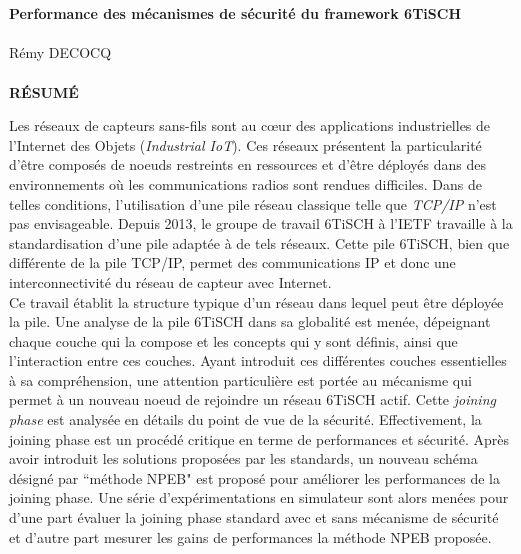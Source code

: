 \documentclass[]{report}
\begin{document}
\newpage
~
\newpage

\vspace{5cm}
~\\

\begin{center}
\textbf{\Large Performance des mécanismes de sécurité du framework 6TiSCH}\\
~\\
{\Large Rémy DECOCQ}\\
~\\
\textbf{\Large RÉSUMÉ}
\end{center}
\vspace{2cm}

\large
Les réseaux de capteurs sans-fils sont au cœur des applications industrielles de l'Internet des Objets (\textit{Industrial IoT}). Ces réseaux présentent la particularité d'être composés de noeuds restreints en ressources et d'être déployés dans des environnements où les communications radios sont rendues difficiles. Dans de telles conditions, l'utilisation d'une pile réseau classique telle que \textit{TCP/IP} n'est pas envisageable. Depuis 2013, le groupe de travail 6TiSCH à l'IETF travaille à la standardisation d'une pile adaptée à de tels réseaux. Cette pile 6TiSCH, bien que différente de la pile TCP/IP, permet des communications IP et donc une interconnectivité du réseau de capteur avec Internet.\\

Ce travail établit la structure typique d'un réseau dans lequel peut être déployée la pile. Une analyse de la pile 6TiSCH dans sa globalité est menée, dépeignant chaque couche qui la compose et les concepts qui y sont définis, ainsi que l'interaction entre ces couches. Ayant introduit ces différentes couches essentielles à sa compréhension, une attention particulière est portée au mécanisme qui permet à un nouveau noeud de rejoindre un réseau 6TiSCH actif. Cette \textit{joining phase} est analysée en détails du point de vue de la sécurité. Effectivement, la joining phase est un procédé critique en terme de performances et sécurité.  Après avoir introduit les solutions proposées par les standards, un nouveau schéma désigné par ``méthode NPEB" est proposé pour améliorer les performances de la joining phase. Une série d'expérimentations en simulateur sont alors menées pour d'une part évaluer la joining phase standard avec et sans mécanisme de sécurité et d'autre part mesurer les gains de performances la méthode NPEB proposée.\\
\end{document}
